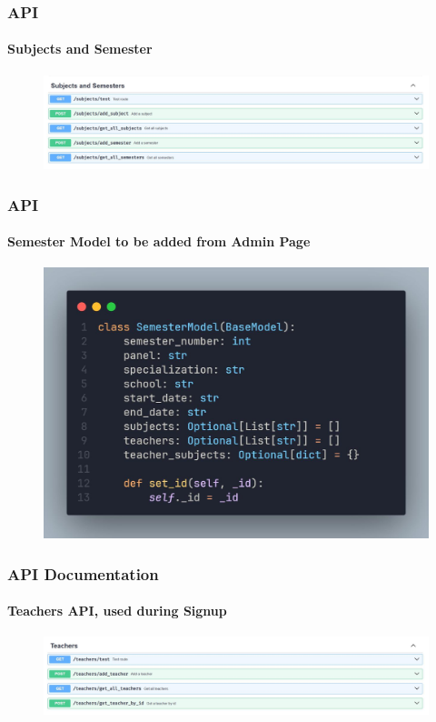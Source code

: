 \documentclass[aspectratio=169]{beamer}
\begin{document}
\begin{frame}
	\centering
	\frametitle{API}
	\framesubtitle{Subjects and Semester}
	\begin{minipage}{0.95\textwidth}
		\begin{figure}[H]
			\centering
			\includegraphics[width=.95\textwidth]{swagger 6.jpg}
		\end{figure}
	\end{minipage}
\end{frame}

\begin{frame}
	\centering
	\frametitle{API}
	\framesubtitle{Semester Model to be added from Admin Page}
	\begin{minipage}{0.95\textwidth}
		\begin{figure}[H]
			\centering
			\includegraphics[width=.95\textwidth]{semester.jpg}
		\end{figure}
	\end{minipage}
\end{frame}

\begin{frame}
	\centering
	\frametitle{API Documentation}
	\framesubtitle{Teachers API, used during Signup}
	\begin{minipage}{0.95\textwidth}
		\begin{figure}[H]
			\centering
			\includegraphics[width=.95\textwidth]{swagger 7.jpg}
		\end{figure}
	\end{minipage}
\end{frame}
\end{document}
